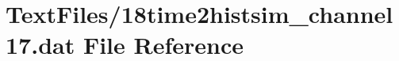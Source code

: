 \hypertarget{18time2histsim__channel17_8dat}{}\section{Text\+Files/18time2histsim\+\_\+channel17.dat File Reference}
\label{18time2histsim__channel17_8dat}
